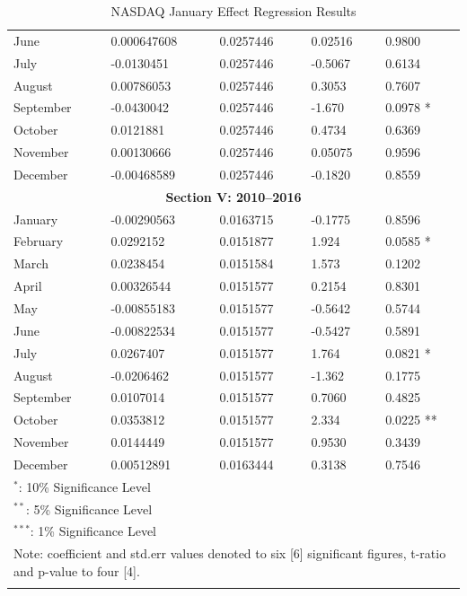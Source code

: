 \documentclass[11pt, english]{article}
\begin{document}
\begin{center}
\begin{longtable}{p{2cm}p{2cm}p{2cm}p{2cm}p{2cm}}
                June & 0.000647608 & 0.0257446 & 0.02516 & 0.9800\\
                July & -0.0130451 & 0.0257446 & -0.5067 & 0.6134\\
                August & 0.00786053 & 0.0257446 & 0.3053 & 0.7607\\
                September & -0.0430042 & 0.0257446 & -1.670 & 0.0978 *\\
                October & 0.0121881 & 0.0257446 & 0.4734 & 0.6369\\
                November & 0.00130666 & 0.0257446 & 0.05075 & 0.9596\\
                December & -0.00468589 & 0.0257446 & -0.1820 & 0.8559\\
                \hline
                \multicolumn{5}{c}{\textbf{Section V: 2010--2016}}\\ 
                \hline 
                January & -0.00290563 & 0.0163715 & -0.1775 & 0.8596\\
                February & 0.0292152 & 0.0151877 & 1.924 & 0.0585 *\\   
                March & 0.0238454 & 0.0151584 & 1.573 & 0.1202\\
                April & 0.00326544 & 0.0151577 & 0.2154 & 0.8301\\
                May & -0.00855183 & 0.0151577 & -0.5642 & 0.5744\\
                June & -0.00822534 & 0.0151577 & -0.5427 & 0.5891\\
                July & 0.0267407 & 0.0151577 & 1.764 & 0.0821 *\\
                August & -0.0206462 & 0.0151577 & -1.362 & 0.1775\\
                September & 0.0107014 & 0.0151577 & 0.7060 & 0.4825\\
                October & 0.0353812 & 0.0151577 & 2.334 & 0.0225 **\\
                November & 0.0144449 & 0.0151577 & 0.9530 & 0.3439\\
                December & 0.00512891 & 0.0163444 & 0.3138 & 0.7546\\
                \hline                                             
                \multicolumn{5}{l}{$^*$: 10\% Significance Level}\\  
                \multicolumn{5}{l}{$^{**}$: 5\% Significance Level}\\ 
                \multicolumn{5}{l}{$^{***}$: 1\% Significance Level}\\
                \hline                                          
		\multicolumn{5}{p{11.5cm}}{Note: coefficient and std.err values denoted to six [6] significant figures, t-ratio and p-value to four [4].}\\
                \hline
                \caption{NASDAQ January Effect Regression Results}
        \end{longtable}
        \end{center}
\end{document}
